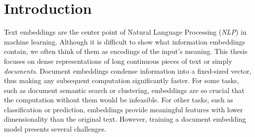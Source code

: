 \chapter*{Introduction}










Text embeddings are the center point of Natural Language Processing
(\emph{NLP}) in machine learning. Although it is difficult to show what
information embeddings contain, we often think of them as encodings of the
input's meaning. This thesis focuses on dense representations of long
continuous pieces of text or simply \emph{documents}. Document embeddings
condense information into a fixed-sized vector, thus making any subsequent
computation significantly faster. For some tasks, such as document semantic
search or clustering, embeddings are so crucial that the computation without
them would be infeasible. For other tasks, such as classification or
prediction, embeddings provide meaningful features with lower dimensionality
than the original text. However, training a document embedding model presents
several challenges.

